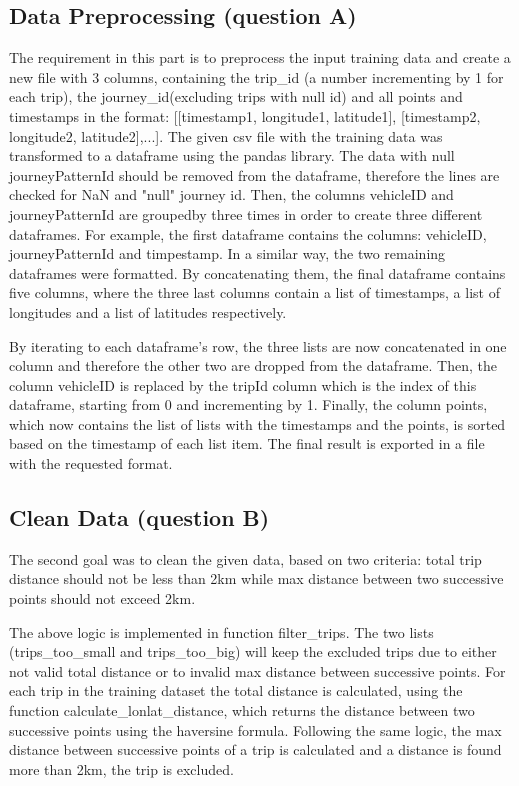 \documentclass[12pt]{article}
\begin{document}
	\subsection{Data Preprocessing (question A)}
	The requirement in this part is to preprocess the input training data and create a new file with 3 columns, containing the trip\_id (a number incrementing by 1 for each trip), the journey\_id(excluding trips with null id) and all points and timestamps in the format: [[timestamp1, longitude1, latitude1], [timestamp2, longitude2, latitude2],...]. The given csv file with the training data was transformed to a dataframe using the pandas library. The data with null journeyPatternId should be removed from the dataframe, therefore the lines are checked for NaN and "null" journey id. Then, the columns vehicleID and journeyPatternId are groupedby three times in order to create three different dataframes. For example, the first dataframe contains the columns: vehicleID, journeyPatternId and timpestamp. In a similar way, the two remaining dataframes were formatted. By concatenating them, the final dataframe contains five columns, where the three last columns contain a list of timestamps, a list of longitudes and a list of latitudes respectively.
	
	By iterating to each dataframe's row, the three lists are now concatenated in one column and therefore the other two are dropped from the dataframe. Then, the column vehicleID is replaced by the tripId column which is the index of this dataframe, starting from 0 and incrementing by 1. Finally, the column points, which now contains the list of lists with the timestamps and the points, is sorted based on the timestamp of each list item. The final result is exported in a file with the requested format.
	
	\subsection{Clean Data (question B)}
	The second goal was to clean the given data, based on two criteria: total trip distance should not be less than 2km while max distance between two successive points should not exceed 2km.
	
	The above logic is implemented in function filter\_trips. The two lists (trips\_too\_small and trips\_too\_big) will keep the excluded trips due to either not valid total distance or to invalid max distance between successive points. For each trip in the training dataset the total distance is calculated, using the function calculate\_lonlat\_distance, which returns the distance between two successive points using the haversine formula. Following the same logic, the max distance between successive points of a trip is calculated and a distance is found more than 2km, the trip is excluded.
	
\end{document}
